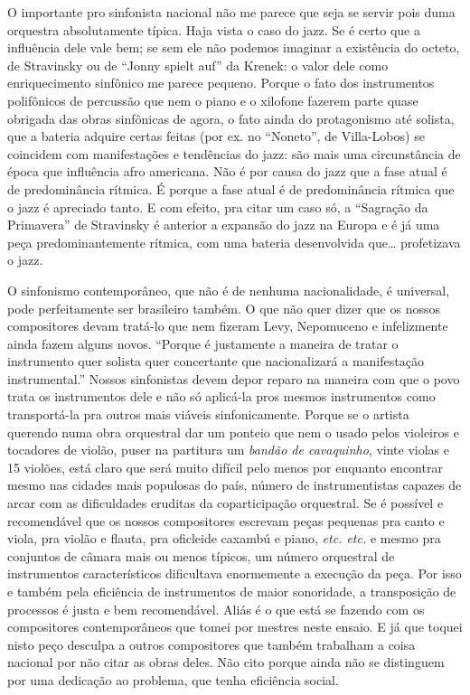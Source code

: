 O importante pro sinfonista nacional não me parece que seja se servir
pois duma orquestra absolutamente típica. Haja vista o caso do jazz. Se
é certo que a influência dele vale bem; se sem ele não podemos imaginar
a existência do octeto, de Stravinsky ou de ``Jonny spielt auf'' da
Krenek: o valor dele como enriquecimento sinfônico me parece pequeno.
Porque o fato dos instrumentos polifônicos de percussão que nem o piano
e o xilofone fazerem parte quase obrigada das obras sinfônicas de agora,
o fato ainda do protagonismo até solista, que a bateria adquire certas
feitas (por ex. no ``Noneto'', de Villa-Lobos) se coincidem com
manifestações e tendências do jazz: são mais uma circunstância de época
que influência afro americana. Não é por causa do jazz que a fase atual
é de predominância rítmica. É porque a fase atual é de predominância
rítmica que o jazz é apreciado tanto. E com efeito, pra citar um caso
só, a ``Sagração da Primavera'' de Stravinsky é anterior a expansão do
jazz na Europa e é já uma peça predominantemente rítmica, com uma
bateria desenvolvida que\ldots{} profetizava o jazz.

O sinfonismo contemporâneo, que não é de nenhuma nacionalidade, é
universal, pode perfeitamente ser brasileiro também. O que não quer
dizer que os nossos compositores devam tratá-lo que nem fizeram Levy,
Nepomuceno e infelizmente ainda fazem alguns novos. ``Porque é
justamente a maneira de tratar o instrumento quer solista quer
concertante que nacionalizará a manifestação instrumental.'' Nossos
sinfonistas devem depor reparo na maneira com que o povo trata os
instrumentos dele e não só aplicá-la pros mesmos instrumentos como
transportá-la pra outros mais viáveis sinfonicamente. Porque se o
artista querendo numa obra orquestral dar um ponteio que nem o usado
pelos violeiros e tocadores de violão, puser na partitura um
\textit{bandão de cavaquinho}, vinte violas e 15 violões, está claro
que será muito difícil pelo menos por enquanto encontrar mesmo nas
cidades mais populosas do país, número de instrumentistas capazes de
arcar com as dificuldades eruditas da coparticipação orquestral. Se é
possível e recomendável que os nossos compositores escrevam peças
pequenas pra canto e viola, pra violão e flauta, pra oficleide caxambú e
piano, \textit{etc. etc.} e mesmo pra conjuntos de câmara mais ou menos típicos,
um número orquestral de instrumentos característicos dificultava
enormemente a execução da peça. Por isso e também pela eficiência de
instrumentos de maior sonoridade, a transposição de processos é justa e
bem recomendável. Aliás é o que está se fazendo com os compositores
contemporâneos que tomei por mestres neste ensaio. E já que toquei nisto
peço desculpa a outros compositores que também trabalham a coisa
nacional por não citar as obras deles. Não cito porque ainda não se
distinguem por uma dedicação ao problema, que tenha eficiência social.

